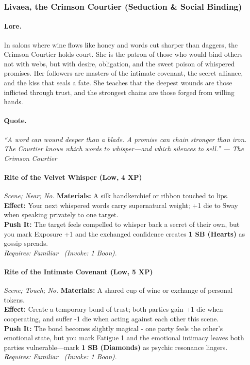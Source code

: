 \subsubsection{Livaea, the Crimson Courtier (Seduction \& Social Binding)}

\paragraph{Lore.}
In salons where wine flows like honey and words cut sharper than daggers, the Crimson Courtier holds court. She is the patron of those who would bind others not with webs, but with desire, obligation, and the sweet poison of whispered promises. Her followers are masters of the intimate covenant, the secret alliance, and the kiss that seals a fate. She teaches that the deepest wounds are those inflicted through trust, and the strongest chains are those forged from willing hands.

\paragraph{Quote.}
\emph{``A word can wound deeper than a blade. A promise can chain stronger than iron. The Courtier knows which words to whisper—and which silences to sell.'' — The Crimson Courtier}

\paragraph{Rite of the Velvet Whisper (Low, 4 XP)} \emph{Scene; Near; No.}
\textbf{Materials:} A silk handkerchief or ribbon touched to lips. \\
\textbf{Effect:} Your next whispered words carry supernatural weight; +1 die to Sway when speaking privately to one target. \\
\textbf{Push It:} The target feels compelled to whisper back a secret of their own, but you mark Exposure +1 and the exchanged confidence creates \textbf{1 SB (Hearts)} as gossip spreads. \\
\emph{Requires: Familiar \ (\textit{Invoke:} 1 Boon).}

\paragraph{Rite of the Intimate Covenant (Low, 5 XP)} \emph{Scene; Touch; No.}
\textbf{Materials:} A shared cup of wine or exchange of personal tokens. \\
\textbf{Effect:} Create a temporary bond of trust; both parties gain +1 die when cooperating, and suffer -1 die when acting against each other this scene. \\
\textbf{Push It:} The bond becomes slightly magical - one party feels the other's emotional state, but you mark Fatigue 1 and the emotional intimacy leaves both parties vulnerable—mark \textbf{1 SB (Diamonds)} as psychic resonance lingers. \\
\emph{Requires: Familiar \ (\textit{Invoke:} 1 Boon).}

